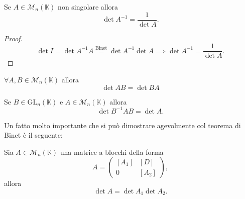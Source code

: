 \begin{cor}
    Se $A \in \mathcal{M}_n(\mathbb{K})$ non singolare allora
    $$
        \det{A^{-1}} = \frac{1}{\det{A}}.
    $$
\end{cor}
\begin{proof}
    $$
        \det{I} = \det{A^{-1} A} \stackrel{\text{Binet}}{=} \det{A^{-1}} \det{A} \implies \det{A^{-1}} = \frac{1}{\det{A}}.
    $$
\end{proof}
\begin{cor}
    $\forall A, B \in \mathcal{M}_n(\mathbb{K})$ allora
    $$
        \det{AB} = \det{BA}
    $$
\end{cor}
\begin{cor}
    Se $B \in \text{GL}_n(\mathbb{K})$ e $A \in \mathcal{M}_n(\mathbb{K})$ allora
    $$
        \det{B^{-1} A B} = \det{A}.
    $$
\end{cor}
Un fatto molto importante che si può dimostrare agevolmente col teorema di Binet è il seguente:
\begin{exercise} \label{ex:4.10}
    Sia $A \in \mathcal{M}_n(\mathbb{K})$ una matrice a blocchi della forma
    $$
        A = \begin{pmatrix}
            [A_1] & [D] \\
            0 & [A_2]
        \end{pmatrix},
    $$
    allora
    $$
        \det{A} = \det{A_1} \det{A_2}.
    $$
\end{exercise}
